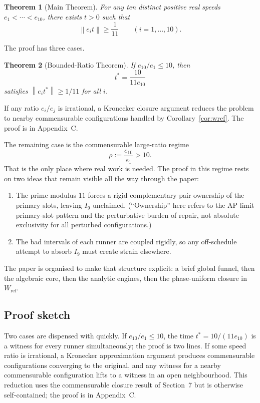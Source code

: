 \documentclass[12pt,a4paper]{amsart}
\newtheorem{theorem}{Theorem}[section]
\theoremstyle{definition}
\theoremstyle{remark}
\newcommand{\Wref}{W_{\mathrm{ref}}}
\newcommand{\norm}[1]{\left\|#1\right\|}
\begin{document}
\begin{theorem}[Main Theorem]
For any ten distinct positive real speeds $e_1<\cdots<e_{10}$, there exists $t>0$ such that
\[
  \norm{e_i t}\ge \frac{1}{11}\qquad(i=1,\ldots,10).
\]
\end{theorem}

The proof has three cases.

\begin{theorem}[Bounded-Ratio Theorem]
If $e_{10}/e_1\le 10$, then
\[
  t^*=\frac{10}{11e_{10}}
\]
satisfies $\norm{e_i t^*}\ge 1/11$ for all $i$.
\end{theorem}

If any ratio $e_i/e_j$ is irrational, a Kronecker closure argument reduces the problem
to nearby commensurable configurations handled by Corollary~\ref{cor:wref}. The proof
is in Appendix~C.

The remaining case is the commensurable large-ratio regime
\[
  \rho := \frac{e_{10}}{e_1} > 10.
\]
That is the only place where real work is needed. The proof in this regime rests on two ideas
that remain visible all the way through the paper:
\begin{enumerate}
  \item The prime modulus $11$ forces a rigid complementary-pair ownership of the primary
        slots, leaving $I_9$ unclaimed. (``Ownership'' here refers to the AP-limit primary-slot
        pattern and the perturbative burden of repair, not absolute exclusivity for all perturbed
        configurations.)
  \item The bad intervals of each runner are coupled rigidly, so any off-schedule attempt to
        absorb $I_9$ must create strain elsewhere.
\end{enumerate}

The paper is organised to make that structure explicit: a brief global funnel, then the
algebraic core, then the analytic engines, then the phase-uniform closure in $\Wref$.

\subsection{Proof sketch}

Two cases are dispensed with quickly. If $e_{10}/e_1\le 10$, the time $t^*=10/(11e_{10})$
is a witness for every runner simultaneously; the proof is two lines. If some speed ratio
is irrational, a Kronecker approximation argument produces commensurable configurations
converging to the original, and any witness for a nearby commensurable configuration
lifts to a witness in an open neighbourhood. This reduction uses the commensurable closure
result of Section~7 but is otherwise self-contained; the proof is in Appendix~C.
\end{document}
